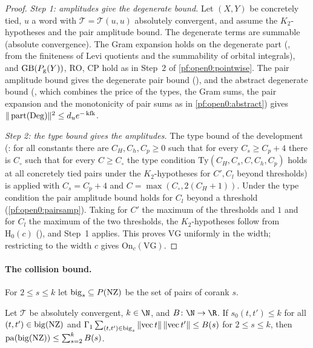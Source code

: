 \begin{proof}
\emph{Step 1: amplitudes give the degenerate bound.} Let $(X,Y)$ be concretely tied, $u$ a word with $\mathcal T=\mathcal T(u,u)$
absolutely convergent, and assume the $K_2$-hypotheses and the pair amplitude bound. The degenerate terms are summable
(absolute convergence). The Gram expansion holds on the degenerate part (,
from the finiteness of Levi quotients and the summability of orbital integrals), and $\mathrm{GB}(P_{\mathrm g}(Y))$,
$\mathrm{RO}$, $\mathrm{CP}$ hold as in Step~2 of \cref{pf:open0:pointwise}. The pair amplitude bound gives the degenerate pair bound
(), and the abstract degenerate bound
(, which combines the price of the types, the Gram sums, the pair
expansion and the monotonicity of pair sums as in \cref{pf:open0:abstract}) gives $\|\operatorname{part}(\mathrm{Deg})\|^2\le
d_ue^{-\operatorname{kfk}}$.

\emph{Step 2: the type bound gives the amplitudes.} The type bound of the development
(: for all constants there are $C_H,C_h,C_p\ge0$ such that for every $C_s\ge C_p+4$ there is
$C_\circ$ such that for every $C\ge C_\circ$ the type condition $\mathrm{Ty}(C_H,C_s,C,C_h,C_p)$ holds at all concretely tied
pairs under the $K_2$-hypotheses for $C',C_l$ beyond thresholds) is applied with $C_s=C_p+4$ and $C=\max(C_\circ,2(C_H+1))$. Under
the type condition the pair amplitude bound holds for $C_l$ beyond a threshold (\cref{pf:open0:pairsamp}). Taking for $C'$ the maximum of the thresholds and $1$ and for $C_l$
the maximum of the two thresholds, the $K_2$-hypotheses follow from $\mathrm{H}_0(c)$ (),
and Step~1 applies. This proves $\mathrm{VG}$ uniformly in the width; restricting to the width $c$ gives $\mathrm{On}_c(\mathrm{VG})$.
\end{proof}

\paragraph{The collision bound.}
For $2\le s\le k$ let $\operatorname{big}_s\subseteq P(\mathrm{NZ})$ be the set of pairs of corank $s$.

\begin{lemma}\label{pf:open0:classes}
Let $\mathcal T$ be absolutely convergent, $k\in\N$, and $B\colon\N\to\R$. If $s_0(t,t')\le k$ for all $(t,t')\in\operatorname{big}(\mathrm{NZ})$
and $\Gamma_1\sum_{(t,t')\in\operatorname{big}_s}\|\mathrm{vec}\,t\|\,\|\mathrm{vec}\,t'\|\le B(s)$ for $2\le s\le k$, then
$\operatorname{pa}(\operatorname{big}(\mathrm{NZ}))\le\sum_{s=2}^kB(s)$.
\ 
\end{lemma}

